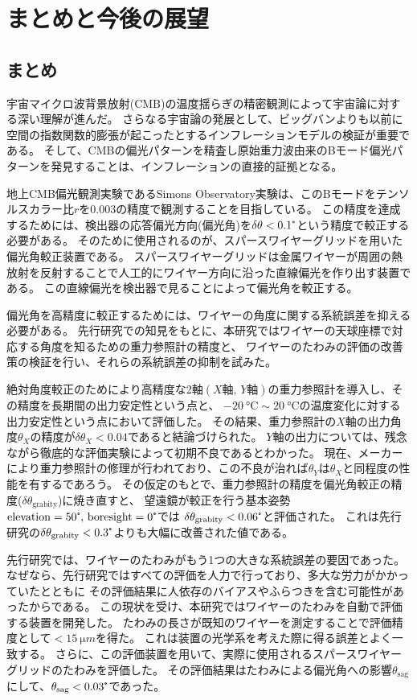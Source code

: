 \documentclass[../../main.tex]{subfiles}
\begin{document}
\chapter{まとめと今後の展望}
\section{まとめ}
宇宙マイクロ波背景放射(CMB)の温度揺らぎの精密観測によって宇宙論に対する深い理解が進んだ。
さらなる宇宙論の発展として、ビッグバンよりも以前に空間の指数関数的膨張が起こったとするインフレーションモデルの検証が重要である。
そして、CMBの偏光パターンを精査し原始重力波由来のBモード偏光パターンを発見することは、インフレーションの直接的証拠となる。

地上CMB偏光観測実験であるSimons Observatory実験は、このBモードをテンソルスカラー比$r$を$0.003$の精度で観測することを目指している。
この精度を達成するためには、検出器の応答偏光方向(偏光角)を$\delta\theta<0.1\tcdegree$という精度で較正する必要がある。
そのために使用されるのが、スパースワイヤーグリッドを用いた偏光角較正装置である。
スパースワイヤーグリッドは金属ワイヤーが周囲の熱放射を反射することで人工的にワイヤー方向に沿った直線偏光を作り出す装置である。
この直線偏光を検出器で見ることによって偏光角を較正する。

偏光角を高精度に較正するためには、ワイヤーの角度に関する系統誤差を抑える必要がある。
先行研究での知見をもとに、本研究ではワイヤーの天球座標で対応する角度を知るための重力参照計の精度と、
ワイヤーのたわみの評価の改善策の検証を行い、それらの系統誤差の抑制を試みた。

絶対角度較正のためにより高精度な2軸$(X\text{軸},\,Y\text{軸})$の重力参照計を導入し、その精度を長期間の出力安定性という点と、
$\SI{-20}{\degreeCelsius}\sim\SI{20}{\degreeCelsius}$の温度変化に対する出力安定性という点において評価した。
その結果、重力参照計の$X$軸の出力角度$\theta_{X}$の精度が$\delta\theta_{X}<0.04$であると結論づけられた。
$Y$軸の出力については、残念ながら徹底的な評価実験によって初期不良であるとわかった。
現在、メーカーにより重力参照計の修理が行われており、この不良が治れば$\theta_{Y}$は$\theta_{X}$と同程度の性能を有するであろう。
その仮定のもとで、重力参照計の精度を偏光角較正の精度($\delta\theta_{\mathrm{grabity}}$)に焼き直すと、
望遠鏡が較正を行う基本姿勢$\mathrm{elevation}=50\tcdegree,\,\mathrm{boresight}=0\tcdegree$では
$\delta\theta_{\mathrm{grabity}}<0.06\tcdegree$と評価された。
これは先行研究の$\delta\theta_{\mathrm{grabity}}<0.3\tcdegree$よりも大幅に改善された値である。

先行研究では、ワイヤーのたわみがもう1つの大きな系統誤差の要因であった。
なぜなら、先行研究ではすべての評価を人力で行っており、多大な労力がかかっていたとともに
その評価結果に人依存のバイアスやふらつきを含む可能性があったからである。
この現状を受け、本研究ではワイヤーのたわみを自動で評価する装置を開発した。
たわみの長さが既知のワイヤーを測定することで評価精度として$<\SI{15}{\micro m}$を得た。
これは装置の光学系を考えた際に得る誤差とよく一致する。
さらに、この評価装置を用いて、実際に使用されるスパースワイヤーグリッドのたわみを評価した。
その評価結果はたわみによる偏光角への影響$\theta_{\mathrm{sag}}$にして、$\theta_{\mathrm{sag}}<0.03\tcdegree$であった。
\end{document}
